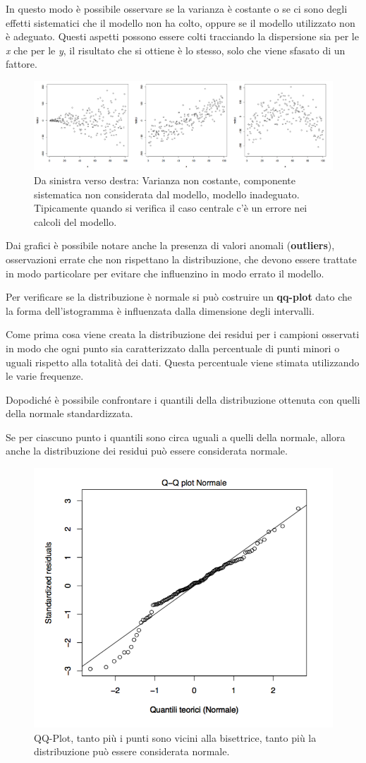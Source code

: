 In questo modo è possibile osservare se la varianza è costante o se ci sono degli effetti sistematici che il modello non ha colto, oppure se il modello utilizzato non è adeguato.
Questi aspetti possono essere colti tracciando la dispersione sia per le \textit{x} che per le \textit{y}, il risultato che si ottiene è lo stesso, solo che viene sfasato di un fattore.

\begin{figure}[htbp]
	\centering
	\includegraphics[width=\textwidth]{./notes/immagini/l6-fig13-1.png}
	\caption{Da sinistra verso destra: Varianza non costante, componente sistematica non considerata dal modello, modello inadeguato. Tipicamente quando si verifica il caso centrale c'è un errore nei calcoli del modello. }
\end{figure}

Dai grafici è possibile notare anche la presenza di valori anomali (\textbf{outliers}), osservazioni errate che non rispettano la distribuzione, che devono essere trattate in modo particolare per evitare che influenzino in modo errato il modello.

Per verificare se la distribuzione è normale si può costruire un \textbf{qq-plot} dato che la forma dell'istogramma è influenzata dalla dimensione degli intervalli.

Come prima cosa viene creata la distribuzione dei residui per i campioni osservati in modo che ogni punto sia caratterizzato dalla percentuale di punti minori o uguali rispetto alla totalità dei dati. Questa percentuale viene stimata utilizzando le varie frequenze. 

Dopodiché è possibile confrontare i quantili della distribuzione ottenuta con quelli della normale standardizzata. 

Se per ciascuno punto i quantili sono circa uguali a quelli della normale, allora anche la distribuzione dei residui può essere considerata normale.

\begin{figure}[htbp]
	\centering
	\includegraphics[width=.6\textwidth]{./notes/immagini/l6-fig14-1.png}
	\caption{QQ-Plot, tanto più i punti sono vicini alla bisettrice, tanto più la distribuzione può essere considerata normale.}
\end{figure}




